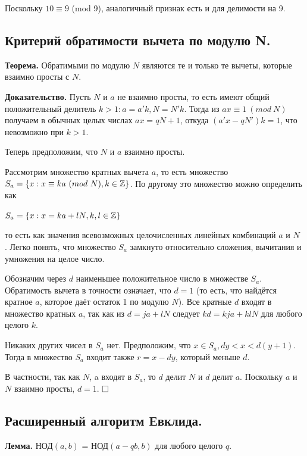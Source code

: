 \documentclass[a4paper, 10pt]{article}
\begin{document}
Поскольку $10 \equiv 9$ (mod 9), аналогичный признак есть и для делимости на 9.

\subsection{Критерий обратимости вычета по модулю N.}

\textbf{Теорема.} Обратимыми по модулю $N$ являются те и только те вычеты, которые взаимно просты с $N$.

\textbf{Доказательство.} Пусть $N$ и $a$ не взаимно просты, то есть имеют общий положительный делитель $k > 1: a = a'k, N = N'k$. Тогда из $ax \equiv 1 \ (mod \ N)$ получаем в обычных целых числах $ax = qN + 1$, откуда $(a'x - qN')k = 1$, что невозможно при
$k > 1$.

Теперь предположим, что $N$ и $a$ взаимно просты.

Рассмотрим множество кратных вычета $a$, то есть множество $S_a = \{x : x \equiv ka
\ (mod \ N), k \in \mathbb{Z} \}$. По другому это множество можно определить как

\begin{center}
    $\displaystyle S_a = \{x : x = ka + lN, k, l \in \mathbb{Z} \}$
\end{center}

то есть как значения всевозможных целочисленных линейных комбинаций $a$ и $N$ .
Легко понять, что множество $S_a$ замкнуто относительно сложения, вычитания и
умножения на целое число.

Обозначим через $d$ наименьшее положительное число в множестве $S_a$. Обратимость вычета в точности означает, что $d = 1$ (то есть, что найдётся кратное $a$, которое даёт остаток 1 по модулю $N$). Все кратные $d$ входят в множество кратных $a$,
так как из $d = ja + lN$ следует $kd = kja + klN$ для любого целого $k$.

Никаких других чисел в $S_a$ нет. Предположим, что $x \in S_a, dy < x < d(y + 1)$. Тогда в множество $S_a$ входит также $r = x - dy$, который меньше $d$.

В частности, так как $N$, a входят в $S_a$, то $d$ делит $N$ и $d$ делит $a$. Поскольку $a$ и $N$ взаимно просты, $d = 1$. $\hfill \square$

\subsection{Расширенный алгоритм Евклида.}

\textbf{Лемма.} НОД$(a, b)$ = НОД$(a - qb, b)$ для любого целого $q$.
\end{document}
